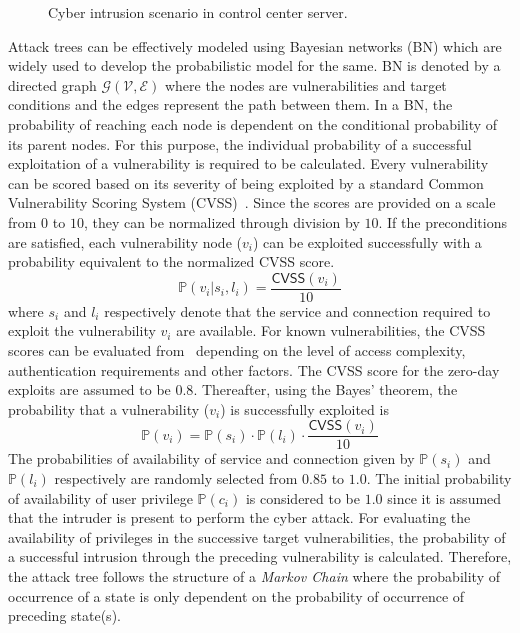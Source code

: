 \begin{figure}[htbp]
\begin{subfigure}{0.22\textwidth}
	\caption{}
	\label{sfig:simpleattacktree}
    \end{subfigure}
	\caption{Cyber intrusion scenario in control center server.}
	\label{fig:example}
\end{figure}
Attack trees can be effectively modeled using Bayesian networks (BN) which are widely used to develop the probabilistic model for the same. BN is denoted by a directed graph $\mathcal{G}(\mathcal{V},\mathcal{E})$ where the nodes are vulnerabilities and target conditions and the edges represent the path between them. In a BN, the probability of reaching each node is dependent on the conditional probability of its parent nodes. For this purpose, the individual probability of a successful exploitation of a vulnerability is required to be calculated. Every vulnerability can be scored based on its severity of being exploited by a standard Common Vulnerability Scoring System (CVSS)~\cite{cvss}. Since the scores are provided on a scale from $0$ to $10$, they can be normalized through division by $10$. If the preconditions are satisfied, each vulnerability node ($v_i$) can be exploited successfully with a probability equivalent to the normalized CVSS score.
\begin{equation}
\mathbb{P}(v_i|s_i,l_i)=\dfrac{\mathsf{CVSS}(v_i)}{10}
\end{equation}
where $s_i$ and $l_i$ respectively denote that the service and connection required to exploit the vulnerability $v_i$ are available. For known vulnerabilities, the CVSS scores can be evaluated from~\cite{nist1,nist2} depending on the level of access complexity, authentication requirements and other factors. The CVSS score for the zero-day exploits are assumed to be $0.8$. Thereafter, using the Bayes' theorem, the probability that a vulnerability ($v_i$) is successfully exploited is
\begin{equation}
\mathbb{P}(v_i)=\mathbb{P}(s_i)\cdot\mathbb{P}(l_i)\cdot\dfrac{\mathsf{CVSS}(v_i)}{10}
\end{equation}
The probabilities of availability of service and connection given by $\mathbb{P}(s_i)$ and $\mathbb{P}(l_i)$ respectively are randomly selected from $0.85$ to $1.0$. The initial probability of availability of user privilege $\mathbb{P}(c_i)$ is considered to be $1.0$ since it is assumed that the intruder is present to perform the cyber attack. For evaluating the availability of privileges in the successive target vulnerabilities, the probability of a successful intrusion through the preceding vulnerability is calculated. Therefore, the attack tree follows the structure of a \textit{Markov Chain} where the probability of occurrence of a state is only dependent on the probability of occurrence of preceding state(s). 

